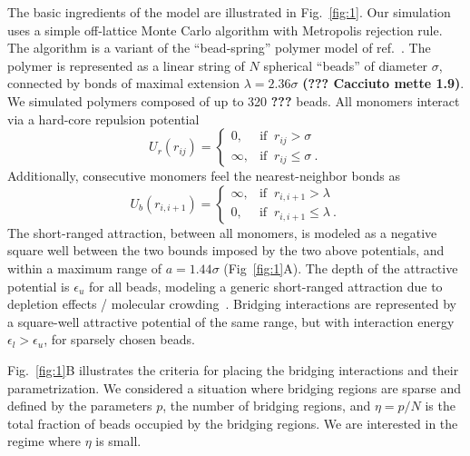 \documentclass[
preprint,
a4paper,
12pt,
superscriptaddress,
pre]{revtex4}
\begin{document}
The basic ingredients of the model are illustrated in
Fig.~\ref{fig:1}. Our simulation uses a simple off-lattice Monte Carlo
algorithm with Metropolis rejection rule. The algorithm is a variant
of the ``bead-spring'' polymer model of ref.~\cite{Cacciuto2006}. The
polymer is represented as a linear string of $N$ spherical ``beads''
of diameter $\sigma$, connected by bonds of maximal extension $\lambda
= 2.36 \sigma$ \textbf{(??? Cacciuto mette 1.9)}. We simulated
polymers composed of up to 320 \textbf{???} beads.  All monomers
interact via a hard-core repulsion potential
\begin{displaymath}
  U_r(r_{ij}) = \begin{cases} 
    0,  & \mbox{if }\ r_{ij} > \sigma \\ 
    \infty, & \mbox{if }\ r_{ij} \leq \sigma \ . 
  \end{cases} 
\end{displaymath}
Additionally, consecutive monomers feel the nearest-neighbor bonds as 
\begin{displaymath}
  U_b(r_{i,i+1}) = \begin{cases} 
    \infty,  & \mbox{if }\ r_{i,i+1} > \lambda \\ 
    0, & \mbox{if }\ r_{i,i+1} \leq \lambda \ . 
  \end{cases} 
\end{displaymath}
The short-ranged attraction, between all monomers, is modeled as a
negative square well between the two bounds imposed by the two above
potentials, and within a maximum range of $a = 1.44 \sigma$
(Fig~\ref{fig:1}A). The depth of the attractive potential is
$\epsilon_u$ for all beads, modeling a generic short-ranged attraction
due to depletion effects / molecular crowding~\cite{Noro2000}.
Bridging interactions are represented by a square-well attractive
potential of the same range, but with interaction energy $\epsilon_l >
\epsilon_u$, for sparsely chosen beads.
%

Fig.~\ref{fig:1}B illustrates the criteria for placing the bridging
interactions and their parametrization. We considered a situation
where bridging regions are sparse and defined by the parameters $p$,
the number of bridging regions, and $\eta=p/N$ is the total fraction
of beads occupied by the bridging regions. We are interested in the
regime where $\eta$ is small. 
\end{document}
